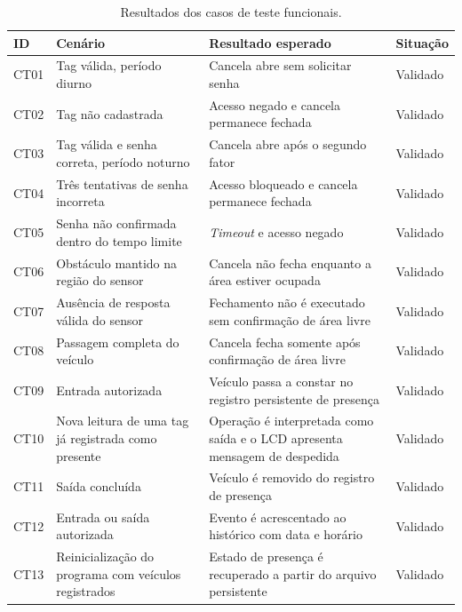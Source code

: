 \documentclass[11pt,a4paper]{article}
\begin{document}
\begin{table}[H]
\centering
\small
\caption{Resultados dos casos de teste funcionais.}
\label{tab:testes}
\begin{tabular}{@{}lL{5.7cm}L{5.5cm}L{2.0cm}@{}}
\toprule
\textbf{ID} & \textbf{Cenário} & \textbf{Resultado esperado} &
\textbf{Situação} \\
\midrule
CT01 & Tag válida, período diurno
& Cancela abre sem solicitar senha
& Validado \\[3pt]

CT02 & Tag não cadastrada
& Acesso negado e cancela permanece fechada
& Validado \\[3pt]

CT03 & Tag válida e senha correta, período noturno
& Cancela abre após o segundo fator
& Validado \\[3pt]

CT04 & Três tentativas de senha incorreta
& Acesso bloqueado e cancela permanece fechada
& Validado \\[3pt]

CT05 & Senha não confirmada dentro do tempo limite
& \textit{Timeout} e acesso negado
& Validado \\[3pt]

CT06 & Obstáculo mantido na região do sensor
& Cancela não fecha enquanto a área estiver ocupada
& Validado \\[3pt]

CT07 & Ausência de resposta válida do sensor
& Fechamento não é executado sem confirmação de área livre
& Validado \\[3pt]

CT08 & Passagem completa do veículo
& Cancela fecha somente após confirmação de área livre
& Validado \\[3pt]

CT09 & Entrada autorizada
& Veículo passa a constar no registro persistente de presença
& Validado \\[3pt]

CT10 & Nova leitura de uma tag já registrada como presente
& Operação é interpretada como saída e o LCD apresenta mensagem de despedida
& Validado \\[3pt]

CT11 & Saída concluída
& Veículo é removido do registro de presença
& Validado \\[3pt]

CT12 & Entrada ou saída autorizada
& Evento é acrescentado ao histórico com data e horário
& Validado \\[3pt]

CT13 & Reinicialização do programa com veículos registrados
& Estado de presença é recuperado a partir do arquivo persistente
& Validado \\
\bottomrule
\end{tabular}
\end{table}
\end{document}
